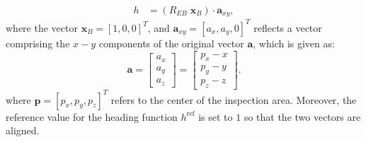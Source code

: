 %
\begin{align}\label{eq:heading_function}
    h &= (R_{EB} \; \mathbf{x}_B)\cdot \mathbf{a}_{xy},
\end{align}
%
where the vector $\mathbf{x}_B = [1, 0, 0]^T$, and $\mathbf{a}_{xy} = [a_{x}, a_{y}, 0]^T$ reflects a vector comprising the $x-y$ components of the original vector $\mathbf{a}$, which is given as:
%
\begin{equation}\label{eq:a}
    \mathbf{a} = \begin{bmatrix}
           a_{x} \\
           a_{y} \\
           a_{z}  
         \end{bmatrix}
    = \begin{bmatrix}
           p_{x}-x \\
           p_{y}-y \\
           p_{z}-z  
         \end{bmatrix}.
\end{equation}
%
where $\mathbf{p} = [p_x, p_y, p_z]^T$ refers to the center of the inspection area. Moreover, the reference value for the heading function $h^\textrm{ref}$ is set to $1$ so that the two vectors are aligned.  

